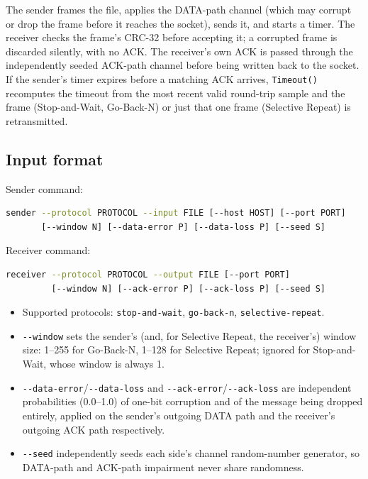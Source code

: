 \documentclass[11pt]{article}
\begin{document}
The sender frames the file, applies the DATA-path channel (which may corrupt or drop the frame
before it reaches the socket), sends it, and starts a timer. The receiver checks the frame's CRC-32
before accepting it; a corrupted frame is discarded silently, with no ACK. The receiver's own
ACK is passed through the independently seeded ACK-path channel before being written back to
the socket. If the sender's timer expires before a matching ACK arrives, \texttt{Timeout()}
recomputes the timeout from the most recent valid round-trip sample and the frame (Stop-and-Wait,
Go-Back-N) or just that one frame (Selective Repeat) is retransmitted.

\subsection{Input format}
Sender command:
\begin{lstlisting}[language=bash]
sender --protocol PROTOCOL --input FILE [--host HOST] [--port PORT]
       [--window N] [--data-error P] [--data-loss P] [--seed S]
\end{lstlisting}
Receiver command:
\begin{lstlisting}[language=bash]
receiver --protocol PROTOCOL --output FILE [--port PORT]
         [--window N] [--ack-error P] [--ack-loss P] [--seed S]
\end{lstlisting}
\begin{itemize}[nosep]
    \item Supported protocols: \texttt{stop-and-wait}, \texttt{go-back-n}, \texttt{selective-repeat}.
    \item \texttt{-{}-window} sets the sender's (and, for Selective Repeat, the receiver's) window size:
          1--255 for Go-Back-N, 1--128 for Selective Repeat; ignored for Stop-and-Wait, whose window is
          always 1.
    \item {\sloppy\texttt{-{}-data-error}/\texttt{-{}-data-loss} and
          \texttt{-{}-ack-error}/\texttt{-{}-ack-loss} are independent probabilities (0.0--1.0) of
          one-bit corruption and of the message being dropped entirely, applied on the sender's
          outgoing DATA path and the receiver's outgoing ACK path respectively.\par}
    \item \texttt{-{}-seed} independently seeds each side's channel random-number generator, so DATA-path
          and ACK-path impairment never share randomness.
\end{itemize}
\end{document}
